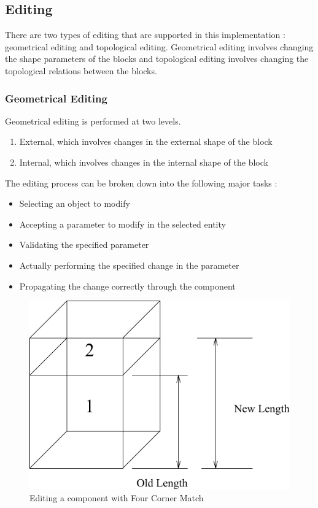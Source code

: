 	\subsection{Editing}

    There are two types of editing that are supported in this implementation :
    geometrical editing and topological editing. Geometrical editing involves 
	changing the shape parameters of the blocks and topological editing 
	involves changing the topological relations between the blocks.

	\subsubsection{Geometrical Editing} 

	Geometrical editing is performed at two levels.

        \begin{enumerate}
        \item
        External, which involves changes in the external shape of the block 
        \item
        Internal, which involves changes in the internal shape of the block
        \end{enumerate}


	The editing process can be broken down into the following major tasks :
	\begin{itemize}
		\item
		Selecting an object to modify
		\item
		Accepting a parameter to modify in the selected entity
		\item
		Validating the specified parameter 
		\item
		Actually performing the specified change in the parameter
		\item
		Propagating the change correctly through the component
	\end{itemize}

        \begin{figure}[htbp]
	\hspace{4cm}
	\includegraphics[scale=0.8]{EDITFCM.pdf}
            \caption{Editing a component with Four Corner Match}
            \label{editfcm}
        \end{figure}

